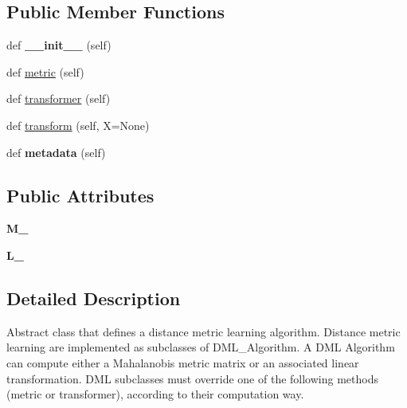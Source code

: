 \subsection*{Public Member Functions}
\begin{DoxyCompactItemize}
\item 
def {\bfseries \+\_\+\+\_\+init\+\_\+\+\_\+} (self)\hypertarget{classdml_1_1dml__algorithm_1_1DML__Algorithm_a3289181fb1120dedb754ef099cf61417}{}\label{classdml_1_1dml__algorithm_1_1DML__Algorithm_a3289181fb1120dedb754ef099cf61417}

\item 
def \hyperlink{classdml_1_1dml__algorithm_1_1DML__Algorithm_a9e344baf8028a0534b242de9c862d1c9}{metric} (self)
\item 
def \hyperlink{classdml_1_1dml__algorithm_1_1DML__Algorithm_a096525d92abf9242115c8f0a1d6f48d3}{transformer} (self)
\item 
def \hyperlink{classdml_1_1dml__algorithm_1_1DML__Algorithm_aa35480582eb941023ecce069496ed202}{transform} (self, X=None)
\item 
def {\bfseries metadata} (self)\hypertarget{classdml_1_1dml__algorithm_1_1DML__Algorithm_a639f5611375b5c11a92e931b1d45bb40}{}\label{classdml_1_1dml__algorithm_1_1DML__Algorithm_a639f5611375b5c11a92e931b1d45bb40}

\end{DoxyCompactItemize}
\subsection*{Public Attributes}
\begin{DoxyCompactItemize}
\item 
{\bfseries M\+\_\+}\hypertarget{classdml_1_1dml__algorithm_1_1DML__Algorithm_acb064d4924c9fb541d714931d8ff6a05}{}\label{classdml_1_1dml__algorithm_1_1DML__Algorithm_acb064d4924c9fb541d714931d8ff6a05}

\item 
{\bfseries L\+\_\+}\hypertarget{classdml_1_1dml__algorithm_1_1DML__Algorithm_adbd133f985a1296a0db3d9892057b0c2}{}\label{classdml_1_1dml__algorithm_1_1DML__Algorithm_adbd133f985a1296a0db3d9892057b0c2}

\end{DoxyCompactItemize}


\subsection{Detailed Description}
\begin{DoxyVerb}    Abstract class that defines a distance metric learning algorithm.
    Distance metric learning are implemented as subclasses of DML_Algorithm.
    A DML Algorithm can compute either a Mahalanobis metric matrix or an associated linear transformation.
    DML subclasses must override one of the following methods (metric or transformer), according to their computation way.
\end{DoxyVerb}
 

